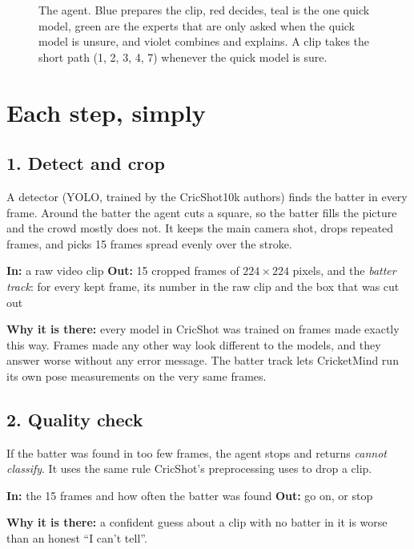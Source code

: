 \documentclass[11pt,a4paper]{article}
\newcommand{\why}[1]{\par\noindent\textbf{Why it is there:} #1}
\newcommand{\inout}[2]{\par\noindent\textbf{In:} #1 \quad
  \textbf{Out:} #2}
\begin{document}
\begin{figure}[H]
\caption{The agent. Blue prepares the clip, red decides, teal is the one
quick model, green are the experts that are only asked when the quick
model is unsure, and violet combines and explains. A clip takes the short
path (1, 2, 3, 4, 7) whenever the quick model is sure.}
\label{fig:agent}
\end{figure}

\section{Each step, simply}

\subsection*{1. Detect and crop}
A detector (YOLO, trained by the CricShot10k authors) finds the batter in
every frame. Around the batter the agent cuts a square, so the batter fills
the picture and the crowd mostly does not. It keeps the main camera shot,
drops repeated frames, and picks 15 frames spread evenly over the stroke.
\inout{a raw video clip}{15 cropped frames of $224 \times 224$ pixels, and
the \emph{batter track}: for every kept frame, its number in the raw clip
and the box that was cut out}
\why{every model in CricShot was trained on frames made exactly this way.
Frames made any other way look different to the models, and they answer
worse without any error message. The batter track lets CricketMind run
its own pose measurements on the very same frames.}

\subsection*{2. Quality check}
If the batter was found in too few frames, the agent stops and returns
\emph{cannot classify}. It uses the same rule CricShot's preprocessing
uses to drop a clip.
\inout{the 15 frames and how often the batter was found}{go on, or stop}
\why{a confident guess about a clip with no batter in it is worse than an
honest ``I can't tell''.}
\end{document}
